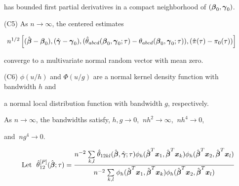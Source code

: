 \documentclass[12pt]{article}
\newcommand{\bmx}{\mbox{\boldmath $x$}}
\newcommand{\bg}{\mbox{\boldmath $\gamma$}}
\newcommand{\bb}{\mbox{\boldmath $\beta$}}
\newcommand{\bmz}{\mbox{\boldmath $z$}}
\def\stackunder#1#2{\mathrel{\mathop{#2}\limits_{#1}}}
\begin{document}
\normalsize 
\noindent \hspace{0.30in}  has bounded first partial derivatives in a compact neighborhood of $(\bb_0, \bg_0)$.

\bigskip

\noindent (C5)  As $n \rightarrow \infty$, the centered estimates

\noindent \hspace{0.50in} $\ n^{1/2} \left[(\hat{\bb} - \bb_0), (\hat{\bg} - \bg_0), (\hat{\theta}_{abcd}(\bb_0, \bg_0;\tau) - \theta_{abcd}(\bb_0, \bg_0;\tau)), (\hat{\pi}(\tau) - \pi_0(\tau) ) \right]$ 

\noindent \hspace{0.30in} converge to a multivariate normal random vector with mean zero.

\bigskip

\noindent (C6) $\phi(u/h)$ and  $\Phi(u/g)$ are a normal kernel density function with bandwidth $h$ and  

\noindent \hspace{0.30in}  a normal local distribution function with bandwidth $g$, respectively. 

\noindent \hspace{0.30in}  As $n \rightarrow \infty$, the bandwidths satisfy, 
 $h,g \rightarrow 0$, $ \ nh^2 \rightarrow \infty$, $ \ nh^4 \rightarrow 0$, 
 
 \noindent \hspace{0.30in}  and $ \ ng^4 \rightarrow 0$.


\vskip 0.50in

\[ \mbox{Let } \ \hat{\theta}_{12}^{[P]}(\hat{\bb};\tau) =  \frac{ n^{-2} \stackunder{k, l }{\sum} \hat{\theta}_{12kl}(\hat{\bb},\hat{\bg};\tau) \phi_h(\hat{\bb}^T\bmx_{1},\hat{\bb}^T\bmx_{k}) \phi_h(\hat{\bb}^T\bmx_{2},\hat{\bb}^T\bmx_{l}) }
 { n^{-2} \stackunder{k, l}{\sum} \phi_h(\hat{\bb}^T\bmx_{1},\hat{\bb}^T\bmx_{k}) \phi_h(\hat{\bb}^T\bmx_{2},\hat{\bb}^T\bmx_{l})}  \]  
 
\bigskip
\end{document}

